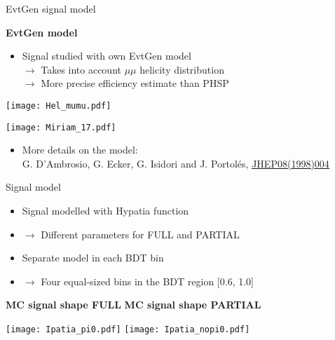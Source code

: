 \documentclass[9pt,hyperref={unicode},utf8]{beamer}
\begin{document}
\begin{frame}{EvtGen signal model}
 \begin{minipage}{0.55\textwidth}
 \textbf{EvtGen model}
 \begin{itemize}
    \setlength\itemsep{1em}
    \item Signal studied with own EvtGen model\\
    $\rightarrow$ Takes into account $\mu\mu$ helicity distribution\\
    $\rightarrow$ More precise efficiency estimate than PHSP
 \end{itemize}
 \end{minipage}
 \begin{minipage}{0.44\textwidth}
   \texttt{[image: Hel\_mumu.pdf]}
 \end{minipage}
  \vspace{0.3cm}
 \begin{center}
   \texttt{[image: Miriam\_17.pdf]}
 \end{center}	
 \begin{itemize}
  \item More details on the model: \\ G. D'Ambrosio, G. Ecker, G. Isidori and J. Portol\'{e}s, \href{http://iopscience.iop.org/article/10.1088/1126-6708/1998/08/004/meta}{\underline{JHEP08(1998)004}}
 \end{itemize}

\end{frame}

\begin{frame}{Signal model}
    \begin{itemize}
     \item Signal modelled with Hypatia function
     \item[] $\rightarrow$ Different parameters for FULL and PARTIAL
     \item Separate model in each BDT bin
     \item[] $\rightarrow$ Four equal-sized bins in the BDT region [0.6, 1.0]
    \end{itemize}
    
    \vspace{0.5cm}

    \hspace{1.2cm} \textbf{MC signal shape FULL}  \hspace{1.4cm} \textbf{MC signal shape PARTIAL}\\
    
    \vspace{0.3cm}
    
    \centering
   \texttt{[image: Ipatia\_pi0.pdf]}
   \texttt{[image: Ipatia\_nopi0.pdf]}
\end{frame}
\end{document}
